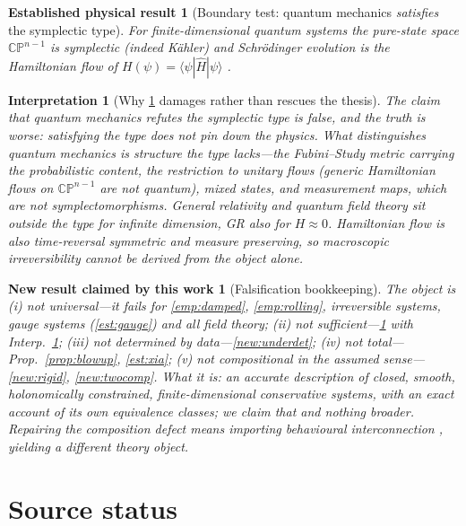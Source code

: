 \documentclass[12pt,a4paper]{article}
\theoremstyle{definition}
\theoremstyle{plain}
\theoremstyle{commentary}
\newtheorem{interpretation}[definition]{Interpretation}
\newtheorem{established}[definition]{Established physical result}
\newtheorem{newresult}[definition]{New result claimed by this work}
\begin{document}
\begin{established}[Boundary test: quantum mechanics \emph{satisfies} the symplectic type]\label{est:qm}
For finite-dimensional quantum systems the pure-state space $\mathbb{CP}^{n-1}$ is symplectic (indeed
K\"ahler) and Schr\"odinger evolution \emph{is} the Hamiltonian flow of
$H(\psi)=\langle\psi|\widehat H|\psi\rangle$ \cite{Kibble1979}.
\end{established}

\begin{interpretation}[Why \ref{est:qm} damages rather than rescues the thesis]\label{int:qm}
The claim that quantum mechanics refutes the symplectic type is false, and the truth is worse:
satisfying the type does not pin down the physics. What distinguishes quantum mechanics is structure
the type lacks---the Fubini--Study metric carrying the probabilistic content, the restriction to
unitary flows (generic Hamiltonian flows on $\mathbb{CP}^{n-1}$ are not quantum), mixed states, and
measurement maps, which are not symplectomorphisms. General relativity and quantum field theory sit
outside the type for infinite dimension, GR also for $H\approx0$. Hamiltonian flow is also
time-reversal symmetric and measure preserving, so macroscopic irreversibility cannot be derived from
the object alone.
\end{interpretation}

\begin{newresult}[Falsification bookkeeping]\label{new:bookkeeping}
The object is (i) \emph{not universal}---it fails for \ref{emp:damped}, \ref{emp:rolling},
irreversible systems, gauge systems (\ref{est:gauge}) and all field theory; (ii) \emph{not
sufficient}---\ref{est:qm} with Interp.~\ref{int:qm}; (iii) \emph{not determined by
data}---\ref{new:underdet}; (iv) \emph{not total}---Prop.~\ref{prop:blowup}, \ref{est:xia};
(v) \emph{not compositional in the assumed sense}---\ref{new:rigid}, \ref{new:twocomp}. What it
\emph{is}: an accurate description of closed, smooth, holonomically constrained, finite-dimensional
conservative systems, with an exact account of its own equivalence classes; we claim that and nothing
broader. Repairing the composition defect means importing behavioural interconnection
\cite{Willems2007}, yielding a \emph{different}
theory object.
\end{newresult}

\section{Source status}
\label{sec:sources}
\end{document}

